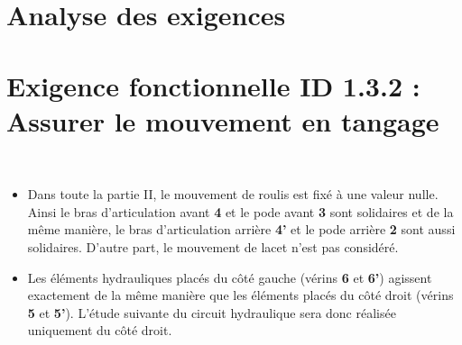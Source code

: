 \section{Analyse des exigences \label{sec:1}}
\ifprof
\begin{corrige}
\end{corrige}
\else
\fi



\section{Exigence fonctionnelle ID 1.3.2 : Assurer le mouvement en tangage \label{sec:2}}

\begin{hypo}~\\
\begin{itemize}
\item Dans toute la partie II, le mouvement de roulis est fixé à une valeur nulle. Ainsi le bras d’articulation avant \textbf{4} et le pode avant \textbf{3} sont solidaires et de la même manière, le bras d’articulation arrière \textbf{4’} et le pode arrière \textbf{2} sont aussi solidaires. D’autre part, le mouvement de lacet n’est pas considéré.
\item Les éléments hydrauliques placés du côté gauche (vérins \textbf{6} et \textbf{6’}) agissent exactement de la même manière que les éléments placés du côté droit (vérins \textbf{5} et \textbf{5’}). L’étude suivante du circuit hydraulique sera donc réalisée uniquement du côté droit.
\end{itemize}
\end{hypo}

